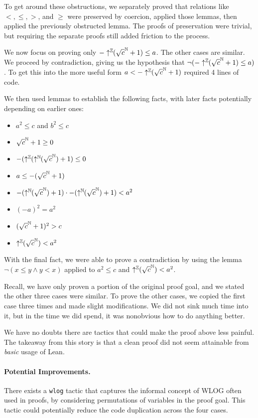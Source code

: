 \documentclass{article}
\begin{document}
To get around these obstructions, we separately proved that relations like $<, \leq, >$, and $\geq$ were preserved by coercion, applied those lemmas, then applied the previously obstructed lemma.
The proofs of preservation were trivial, but requiring the separate proofs still added friction to the process.

We now focus on proving only $-\uparrow^{\mathbb{Z}}\!\!(\sqrt{c}^{\mathbb{N}} + 1) \leq a$.
The other cases are similar.
We proceed by contradiction, giving us the hypothesis that
$\neg(-\uparrow^{\mathbb{Z}}\!\!(\sqrt{c}^{\mathbb{N}} + 1) \leq a)$.
To get this into the more useful form $a < -\uparrow^{\mathbb{Z}}\!\!(\sqrt{c}^{\mathbb{N}} + 1)$ required 4 lines of code.

We then used lemmas to establish the following facts, with later facts potentially depending on earlier ones:
\begin{itemize}
  \item $a^2 \leq c$ and $b^2 \leq c$
  \item $\sqrt{c}^{\mathbb{N}} + 1 \geq 0$
  \item $-(\uparrow^{\mathbb{Z}}\!\!(\uparrow^{\mathbb{N}}\!\!(\sqrt{c}^{\mathbb{N}}) + 1) \leq 0$
  \item $a \leq -(\sqrt{c}^{\mathbb{N}} + 1)$
  \item $-(\uparrow^{\mathbb{N}}\!\!(\sqrt{c}^{\mathbb{N}}) + 1) \cdot -(\uparrow^{\mathbb{N}}\!\!(\sqrt{c}^{\mathbb{N}}) + 1) < a^2$
  \item $(-a)^2 = a^2$
  \item $(\sqrt{c}^{\mathbb{N}} + 1)^2 > c$
  \item $\uparrow^{\mathbb{Z}}\!\!(\sqrt{c}^{\mathbb{N}}) < a^2$
\end{itemize}
With the final fact, we were able to prove a contradiction by using the lemma $\neg(x \leq y \wedge y < x)$ applied to $a^2 \leq c$ and $\uparrow^{\mathbb{Z}}\!\!(\sqrt{c}^{\mathbb{N}}) < a^2$.

Recall, we have only proven a portion of the original proof goal, and we stated the other three cases were similar.
To prove the other cases, we copied the first case three times and made slight modifications.
We did not sink much time into it, but in the time we did spend, it was nonobvious how to do anything better.

We have no doubts there are tactics that could make the proof above less painful.
The takeaway from this story is that a clean proof did not seem attainable from \textit{basic} usage of Lean.

\paragraph{Potential Improvements.}
There exists a \texttt{wlog} tactic that captures the informal concept of WLOG often used in proofs, by considering permutations of variables in the proof goal.
This tactic could potentially reduce the code duplication across the four cases.
\end{document}
